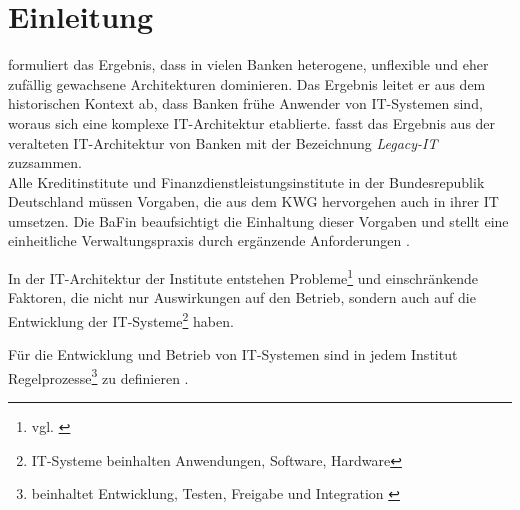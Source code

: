\chapter{Einleitung}
\label{ch:intro}

\citet{Brockhoff2006} formuliert das Ergebnis, dass in vielen Banken heterogene, unflexible und eher zufällig gewachsene Architekturen dominieren. Das Ergebnis leitet er aus dem historischen Kontext ab, dass Banken frühe Anwender von IT-Systemen sind, woraus sich eine komplexe IT-Architektur etablierte.
\citet{Strietzel2018} fasst das Ergebnis aus der veralteten IT-Architektur von Banken mit der Bezeichnung \emph{Legacy-IT} zuzsammen.
\medskip
\\
Alle Kreditinstitute und Finanzdienstleistungsinstitute in der Bundesrepublik Deutschland müssen Vorgaben, die aus dem \ac{KWG} hervorgehen auch in ihrer IT umsetzen. Die \ac{BaFin} beaufsichtigt die Einhaltung dieser Vorgaben und stellt eine einheitliche Verwaltungspraxis \cite{BaFin:Verwaltungspraxis} durch ergänzende Anforderungen \cite{MaRisk:2017, BAIT:2018}. 

In der IT-Architektur der Institute entstehen Probleme\footnote{vgl. \cite{mci/Disterer2011}} und einschränkende Faktoren, die nicht nur Auswirkungen auf den Betrieb, sondern auch auf die Entwicklung der IT-Systeme\footnote{IT-Systeme beinhalten Anwendungen, Software, Hardware} haben. 

Für die Entwicklung und Betrieb von IT-Systemen sind in jedem Institut Regelprozesse\footnote{beinhaltet Entwicklung, Testen, Freigabe und Integration \cite{MaRisk:2017}} zu definieren \cite{MaRisk:2017}. 

